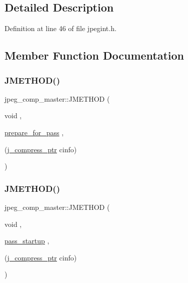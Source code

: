 \subsection{Detailed Description}


Definition at line 46 of file jpegint.\+h.



\subsection{Member Function Documentation}
\mbox{\label{structjpeg__comp__master_afdbee5aedaedd9c6c9837b6bfd834a63}} 
\subsubsection{\texorpdfstring{JMETHOD()}{JMETHOD()}\hspace{0.1cm}{\footnotesize\ttfamily [1/3]}}
{\footnotesize\ttfamily jpeg\+\_\+comp\+\_\+master\+::\+J\+M\+E\+T\+H\+OD (\begin{DoxyParamCaption}\item[{void}]{,  }\item[{\mbox{\hyperlink{jcmaster_8c_a811c02b8de42399196fc3e0eb08c40a5}{prepare\+\_\+for\+\_\+pass}}}]{,  }\item[{(\mbox{\hyperlink{jpeglib_8h_add2a072c54e3a51550f4975f7ddb91e7}{j\+\_\+compress\+\_\+ptr}} cinfo)}]{ }\end{DoxyParamCaption})}

\mbox{\label{structjpeg__comp__master_ac7e4391d1afe92c685cb4ffea5383d2c}} 
\subsubsection{\texorpdfstring{JMETHOD()}{JMETHOD()}\hspace{0.1cm}{\footnotesize\ttfamily [2/3]}}
{\footnotesize\ttfamily jpeg\+\_\+comp\+\_\+master\+::\+J\+M\+E\+T\+H\+OD (\begin{DoxyParamCaption}\item[{void}]{,  }\item[{\mbox{\hyperlink{jcmaster_8c_a41d1d2da456f1cd859c69823965becbc}{pass\+\_\+startup}}}]{,  }\item[{(\mbox{\hyperlink{jpeglib_8h_add2a072c54e3a51550f4975f7ddb91e7}{j\+\_\+compress\+\_\+ptr}} cinfo)}]{ }\end{DoxyParamCaption})}

